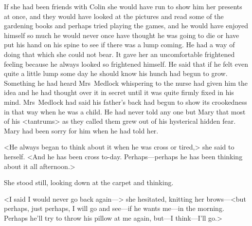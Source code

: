 If she had been friends with Colin she would have run to show him her presents at once, and they would have looked at the pictures and read some of the gardening books and perhaps tried playing the games, and he would have enjoyed himself so much he would never once have thought he was going to die or have put his hand on his spine to see if there was a lump coming. He had a way of doing that which she could not bear. It gave her an uncomfortable frightened feeling because he always looked so frightened himself. He said that if he felt even quite a little lump some day he should know his hunch had begun to grow. Something he had heard Mrs~Medlock whispering to the nurse had given him the idea and he had thought over it in secret until it was quite firmly fixed in his mind. Mrs~Medlock had said his father's back had begun to show its crookedness in that way when he was a child. He had never told any one but Mary that most of his <tantrums> as they called them grew out of his hysterical hidden fear. Mary had been sorry for him when he had told her.

<He always began to think about it when he was cross or tired,> she said to herself. <And he has been cross to-day. Perhaps—perhaps he has been thinking about it all afternoon.>

She stood still, looking down at the carpet and thinking.

<I said I would never go back again—> she hesitated, knitting her brows—<but perhaps, just perhaps, I will go and see—if he wants me—in the morning. Perhaps he'll try to throw his pillow at me again, but—I think—I'll go.>

